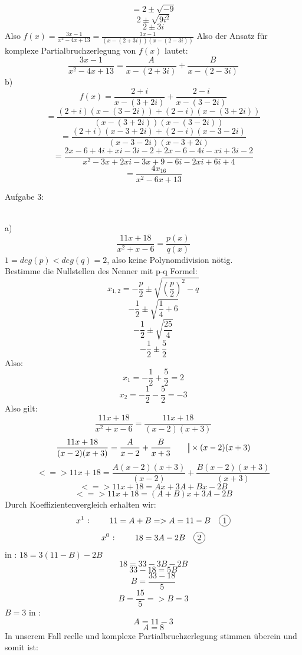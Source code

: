 \documentclass[11pt]{article}
\newcommand\mybar{\kern1pt\rule[-\dp\strutbox]{.8pt}{\baselineskip}\kern1pt}
\newcommand*\circled[1]{\tikz[baseline=(char.base)]{
            \node[shape=circle,draw,inner sep=2pt] (char) {#1};}}
\begin{document}
				$$=2\pm \sqrt{-9}$$
				$$2 \pm \sqrt{9i^2}$$
				$$2\pm 3i$$
				Also $f(x)=\frac{3x-1}{x^2-4x+13}=\frac{3x-1}{(x-(2+3i))(x-(2-3i))}$
				Also der Ansatz für komplexe Partialbruchzerlegung von $f(x)$ lautet:
				$$\frac{3x-1}{x^2-4x+13}=\frac{A}{x-(2+3i)}+\frac{B}{x-(2-3i)}$$
			\indent b)\\
				$$f(x)=\frac{2+i}{x-(3+2i)}+\frac{2-i}{x-(3-2i)}$$
				$$=\frac{(2+i)(x-(3-2i))+(2-i)(x-(3+2i))}{(x-(3+2i))(x-(3-2i))}$$
				$$=\frac{(2+i)(x-3+2i)+(2-i)(x-3-2i)}{(x-3-2i)(x-3+2i)}$$
				$$=\frac{2x-6+4i+xi-3i-2+2x-6-4i-xi+3i-2}{x^2-3x+2xi-3x+9-6i-2xi+6i+4}$$
				$$=\frac{4x_16}{x^2-6x+13}$$
		\noindent \begin{Large}Aufgabe 3:\end{Large}\\[2pt]
			\indent a)\\
				$$\frac{11x+18}{x^2+x-6}=\frac{p(x)}{q(x)}$$
				$1=deg(p)<deg(q)=2$, also keine Polynomdivision nötig.\\
				Bestimme die Nullstellen des Nenner mit p-q Formel:\\
				$$x_{1,2}=-\frac{p}{2}\pm \sqrt{\left(\frac{p}{2}\right)^2-q}$$
				$$-\frac{1}{2}\pm\sqrt{\frac{1}{4}+6}$$
				$$-\frac{1}{2}\pm\sqrt{\frac{25}{4}}$$
				$$-\frac{1}{2}\pm\frac{5}{2}$$
				Also:\\
				$$x_1=-\frac{1}{2}+\frac{5}{2}=2$$
				$$x_2=-\frac{1}{2}-\frac{5}{2}=-3$$
				Also gilt:\\
				$$\frac{11x+18}{x^2+x-6}=\frac{11x+18}{(x-2)(x+3)}$$
				$$\frac{11x+18}{(x-2)(x+3)}=\frac{A}{x-2}+\frac{B}{x+3} \hspace{20pt} \mybar \times (x-2)(x+3)$$
				$$<=>11x+18=\frac{A(x-2)(x+3)}{(x-2)}+\frac{B(x-2)(x+3)}{(x+3)}$$
				$$<=>11x+18=Ax+3A+Bx-2B$$
				$$<=>11x+18=(A+B)x+3A-2B$$
				Durch Koeffizientenvergleich erhalten wir:\\
				$$x^1 \mbox{ : } \hspace{20pt} 11=A+B=>A=11-B \hspace{10pt} \mbox{\circled{1}}$$
				$$x^0 \mbox{ : } \hspace{20pt} 18=3A-2B \hspace{10pt} \mbox{\circled{2}}$$
				\indent \circled{1} in \circled{2}: \hspace{50pt} $18=3(11-B)-2B$
				$$18=33-3B-2B$$
				$$33-18=5B$$
				$$B=\frac{33-18}{5}$$
				$$B=\frac{15}{5}=>B=3$$
				\indent $B=3$ in \circled{1}:\\
				$$A=11-3$$
				$$A=8$$
				In unserem Fall reelle und komplexe Partialbruchzerlegung stimmen überein und somit ist:\\
\end{document}
